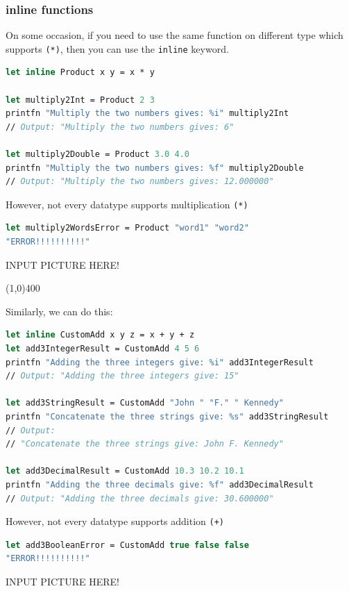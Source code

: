 \documentclass[12pt]{article}
\begin{document}
\subsubsection{inline functions}
On some occasion, if you need to use the same function on different type which supports \texttt{(*)}, then you can use the \texttt{inline} keyword.
\begin{lstlisting}[language=FSharp]
let inline Product x y = x * y

let multiply2Int = Product 2 3
printfn "Multiply the two numbers gives: %i" multiply2Int
// Output: "Multiply the two numbers gives: 6"

let multiply2Double = Product 3.0 4.0
printfn "Multiply the two numbers gives: %f" multiply2Double
// Output: "Multiply the two numbers gives: 12.000000"
\end{lstlisting}
However, not every datatype supports multiplication \texttt{(*)}

\begin{lstlisting}[language=FSharp]
let multiply2WordsError = Product "word1" "word2"
"ERROR!!!!!!!!!!"
\end{lstlisting}
\begin{center}
INPUT PICTURE HERE!
\end{center}
\begin{center}
\line(1,0){400}
\end{center}
Similarly, we can do this:
\begin{lstlisting}[language=FSharp]
let inline CustomAdd x y z = x + y + z
let add3IntegerResult = CustomAdd 4 5 6
printfn "Adding the three integers give: %i" add3IntegerResult
// Output: "Adding the three integers give: 15"

let add3StringResult = CustomAdd "John " "F." " Kennedy"
printfn "Concatenate the three strings give: %s" add3StringResult
// Output:
// "Concatenate the three strings give: John F. Kennedy"

let add3DecimalResult = CustomAdd 10.3 10.2 10.1
printfn "Adding the three decimals give: %f" add3DecimalResult
// Output: "Adding the three decimals give: 30.600000"
\end{lstlisting}
However, not every datatype supports addition \texttt{(+)}
\begin{lstlisting}[language=FSharp]
let add3BooleanError = CustomAdd true false false
"ERROR!!!!!!!!!!"
\end{lstlisting}
\begin{center}
INPUT PICTURE HERE!
\end{center}
\end{document}

